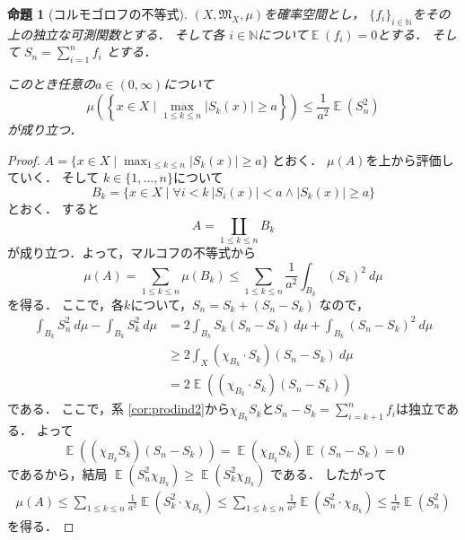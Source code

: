 \documentclass[leqno, a4paper, 12pt]{jsarticle}
\newtheorem{prop}[thm]{命題}
\newcommand{\nn}{\mathbb{N}}
\DeclareMathOperator{\mean}{\mathbb{E}}
\begin{document}
\begin{prop}[コルモゴロフの不等式]\label{prop:inq}
$(X, \mathfrak{M}_X, \mu)$を確率空間とし，
$\{f_i\}_{i\in \nn}$をその上の独立な可測関数とする．
そして各
$i\in \nn$について$\mean(f_i)=0$とする．
そして
$S_{n}=\sum_{i=1}^{n}f_{i}$
とする．

このとき任意の$a\in (0, \infty)$について
\[
\mu\left(\left\{x\in X\mid \max_{1\le k\le n}|S_k(x)|\ge a\right\}\right)\le \frac{1}{a^2}\mean(S_n^2)
\]
が成り立つ．
\end{prop}
\begin{proof}
$A=\{x\in X\mid \max_{1\le k\le n}|S_k(x)|\ge a\}$
とおく．
$\mu(A)$を上から評価していく．
そして
$k\in \{1,\dots,  n\}$について
\[
B_k=\{x\in X\mid \forall i<k \ |S_i(x)|<a \land |S_k(x)|\ge a\}
\]
とおく．
すると
\[
A=\coprod_{1\le k \le n}B_k
\]
が成り立つ．よって，マルコフの不等式から
\[
\mu(A)=\sum_{1\le k\le n}\mu(B_k)\le \sum_{1\le k\le n}\frac{1}{a^2}\int_{B_k}(S_k)^2\ d\mu
\]
を得る．
ここで，各$k$について，$S_n=S_k+(S_n-S_k)$
なので，
\begin{align*}
\int_{B_k}S_n^2\ d\mu-\int_{B_k}S_k^2\ d\mu&=
2\int_{B_k}S_k(S_n-S_k)\ d\mu+\int_{B_k}(S_n-S_k)^2\ d\mu\\
&\ge 2\int_{X}(\chi_{B_k}\cdot S_k)(S_n-S_k)\ d\mu\\
&=2\mean((\chi_{B_k}\cdot S_k)(S_n-S_k))
\end{align*}
である．
ここで，系 \ref{cor:prodind2}から$\chi_{B_{k}}S_k$と$S_{n}-S_{k}=\sum_{i=k+1}^{n}f_{i}$は独立である．
よって
\[
\mean((\chi_{B_{k}}S_k)(S_n-S_k))
=
\mean(\chi_{B_{k}}S_k)\mean(S_{n}-S_{k})=0
\]
であるから，結局
$\mean(S_{n}^{2}\chi_{B_{k}})\ge 
\mean(S_{k}^{2}\chi_{B_{k}})$
である．
したがって
\begin{align*}
\mu(A)\le 
\sum_{1\le k\le n}\frac{1}{a^2}\mean(S_{k}^{2}\cdot \chi_{B_{k}})
\le \sum_{1\le k\le n}\frac{1}{a^2}\mean(S_n^2\cdot \chi_{B_{k}})
\le 
\frac{1}{a^2}\mean(S_n^2)
\end{align*}
を得る．
\end{proof}
\end{document}

